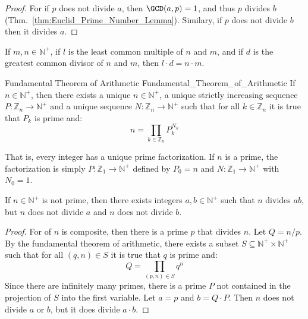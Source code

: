     \begin{proof}
        For if $p$ does not divide $a$, then $\GCD(a,p)=1$, and thus
        $p$ divides $b$ (Thm.~\ref{thm:Euclid_Prime_Number_Lemma}).
        Similary, if $p$ does not divide $b$ then it divides $a$.
    \end{proof}
    \begin{theorem}
        If $m,n\in\mathbb{N}^{+}$, if $l$ is the least common multiple of
        $n$ and $m$, and if $d$ is the greatest common divisor of $n$ and
        $m$, then $l\cdot{d}=n\cdot{m}$.
    \end{theorem}
    \begin{ftheorem}{Fundamental Theorem of Arithmetic}
                    {Fundamental_Theorem_of_Arithmetic}
        If $n\in\mathbb{N}^{+}$, then there exists a unique
        $n\in\mathbb{N}^{+}$, a unique strictly increasing sequence
        $P:\mathbb{Z}_{n}\rightarrow\mathbb{N}^{+}$ and a unique
        sequence $N:\mathbb{Z}_{n}\rightarrow\mathbb{N}^{+}$ such that
        for all $k\in\mathbb{Z}_{n}$ it is true that $P_{k}$ is prime
        and:
        \begin{equation*}
            n=\prod_{k\in\mathbb{Z}_{n}}P_{k}^{N_{k}}
        \end{equation*}
    \end{ftheorem}
    That is, every integer has a unique prime factorization. If $n$ is a
    prime, the factorization is simply
    $P:\mathbb{Z}_{1}\rightarrow\mathbb{N}^{+}$ defined by $P_{0}=n$ and
    $N:\mathbb{Z}_{1}\rightarrow\mathbb{N}^{+}$ with $N_{0}=1$.
    \begin{theorem}
        \label{thm:Composite_N_Exists_AB_N_Div_AB_and_N_NDiv_A_or_B}%
        If $n\in\mathbb{N}^{+}$ is not prime, then there exists
        integers $a,b\in\mathbb{N}^{+}$ such that $n$ divides
        $ab$, but $n$ does not divide $a$ and $n$ does not divide $b$.
    \end{theorem}
    \begin{proof}
        For of $n$ is composite, then there is a prime $p$ that divides
        $n$. Let $Q=n/p$. By the fundamental theorem of arithmetic,
        there exists a subset
        $S\subseteq\mathbb{N}^{+}\times\mathbb{N}^{+}$ such that for all
        $(q,n)\in{S}$ it is true that $q$ is prime and:
        \begin{equation}
            Q=\prod_{(p,n)\in{S}}q^{n}
        \end{equation}
        Since there are infinitely many primes, there is a prime $P$ not
        contained in the projection of $S$ into the first variable. Let
        $a=p$ and $b=Q\cdot{P}$. Then $n$ does not divide $a$ or $b$,
        but it does divide $a\cdot{b}$.
    \end{proof}

